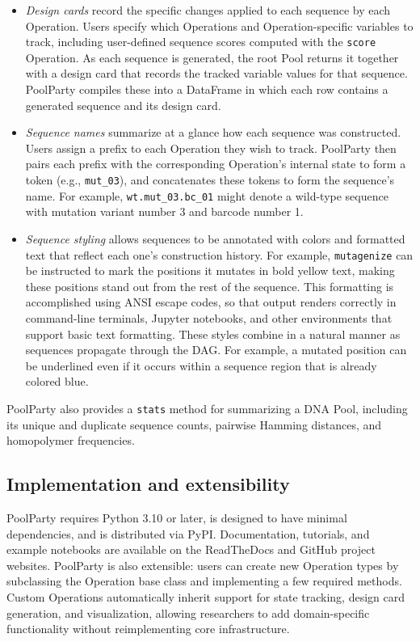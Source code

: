 \documentclass[pdflatex,sn-vancouver-num,referee,oneside]{sn-jnl}
\newif\ifshowquoted
\newcommand{\quoted}[1]{\ifshowquoted\textcolor{quotedtext}{#1}\else#1\fi}
\begin{document}
\begin{itemize}
\item \emph{Design cards} record the specific changes applied to each sequence by each Operation. Users specify which Operations and Operation-specific variables to track, including user-defined sequence scores computed with the \texttt{score} Operation. As each sequence is generated, the root Pool returns it together with a design card that records the tracked variable values for that sequence. PoolParty compiles these into a DataFrame in which each row contains a generated sequence and its design card.

\item \emph{Sequence names} summarize at a glance how each sequence was constructed. Users assign a prefix to each Operation they wish to track. PoolParty then pairs each prefix with the corresponding Operation's internal state to form a token (e.g., \texttt{mut\_03}), and concatenates these tokens to form the sequence's name. For example, \texttt{wt.mut\_03.bc\_01} might denote a wild-type sequence with mutation variant number 3 and barcode number 1.

\item \emph{Sequence styling} allows sequences to be annotated with colors and formatted text that reflect each one's construction history. For example, \texttt{mutagenize} can be instructed to mark the positions it mutates in bold yellow text, making these positions stand out from the rest of the sequence. This formatting is accomplished using ANSI escape codes, so that output renders correctly in command-line terminals, Jupyter notebooks, and other environments that support basic text formatting. These styles combine in a natural manner as sequences propagate through the DAG. For example, a mutated position can be underlined even if it occurs within a sequence region that is already colored blue.
\end{itemize}

\quoted{PoolParty also provides a \texttt{stats} method for summarizing a DNA Pool, including its unique and duplicate sequence counts, pairwise Hamming distances, and homopolymer frequencies.}

\subsection*{Implementation and extensibility}\label{subsec:implementation-and-extensibility}

PoolParty requires Python 3.10 or later, is designed to have minimal dependencies, and is distributed via PyPI. Documentation, tutorials, and example notebooks are available on the ReadTheDocs and GitHub project websites. PoolParty is also extensible: users can create new Operation types by subclassing the Operation base class and implementing a few required methods. Custom Operations automatically inherit support for state tracking, design card generation, and visualization, allowing researchers to add domain-specific functionality without reimplementing core infrastructure.
\end{document}
